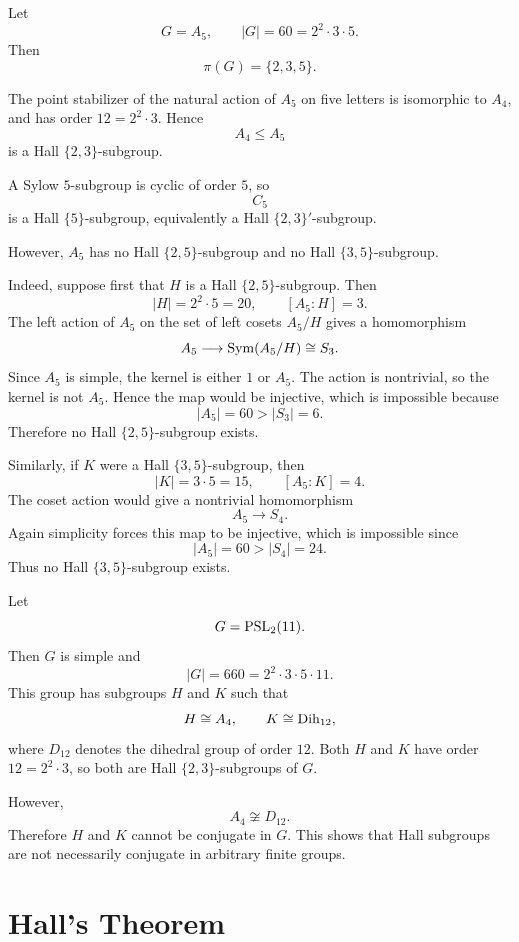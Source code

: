\begin{example}
Let
\[
    G=A_5,\qquad |G|=60=2^2\cdot 3\cdot 5.
\]
Then
\[
    \pi(G)=\{2,3,5\}.
\]

The point stabilizer of the natural action of \(A_5\) on five letters is isomorphic
to \(A_4\), and has order \(12=2^2\cdot 3\). Hence
\[
    A_4\leq A_5
\]
is a Hall \(\{2,3\}\)-subgroup.

A Sylow \(5\)-subgroup is cyclic of order \(5\), so
\[
    C_5
\]
is a Hall \(\{5\}\)-subgroup, equivalently a Hall \(\{2,3\}'\)-subgroup.

However, \(A_5\) has no Hall \(\{2,5\}\)-subgroup and no Hall
\(\{3,5\}\)-subgroup.

Indeed, suppose first that \(H\) is a Hall \(\{2,5\}\)-subgroup. Then
\[
    |H|=2^2\cdot 5=20,
    \qquad
    [A_5:H]=3.
\]
The left action of \(A_5\) on the set of left cosets \(A_5/H\) gives a
homomorphism
\[
    A_5\longrightarrow \operatorname{Sym}(A_5/H)\cong S_3.
\]
Since \(A_5\) is simple, the kernel is either \(1\) or \(A_5\). The action is
nontrivial, so the kernel is not \(A_5\). Hence the map would be injective,
which is impossible because
\[
    |A_5|=60>|S_3|=6.
\]
Therefore no Hall \(\{2,5\}\)-subgroup exists.

Similarly, if \(K\) were a Hall \(\{3,5\}\)-subgroup, then
\[
    |K|=3\cdot 5=15,
    \qquad
    [A_5:K]=4.
\]
The coset action would give a nontrivial homomorphism
\[
    A_5\longrightarrow S_4.
\]
Again simplicity forces this map to be injective, which is impossible since
\[
    |A_5|=60>|S_4|=24.
\]
Thus no Hall \(\{3,5\}\)-subgroup exists.
\end{example}

\begin{example}
Let
\[
    G=\operatorname{PSL}_2(11).
\]
Then \(G\) is simple and
\[
    |G|=660=2^2\cdot 3\cdot 5\cdot 11.
\]
This group has subgroups \(H\) and \(K\) such that
\[
    H\cong A_4,
    \qquad
    K\cong \operatorname{Dih}_{12},
\]
where \(D_{12}\) denotes the dihedral group of order \(12\). Both \(H\) and
\(K\) have order \(12=2^2\cdot 3\), so both are Hall \(\{2,3\}\)-subgroups of
\(G\).

However,
\[
    A_4\not\cong D_{12}.
\]
Therefore \(H\) and \(K\) cannot be conjugate in \(G\). This shows that Hall
subgroups are not necessarily conjugate in arbitrary finite groups.
\end{example}

\section{Hall's Theorem}

